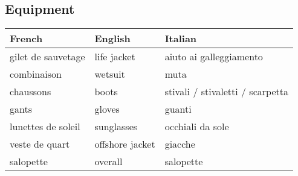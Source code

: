 \documentclass[a4paper, 12pt, twoside]{article}
\begin{document}
    \begin{indt}{\section{Equipment}} %
        \begin{tabular}{|l|l|l|}
            \hline %
            \textbf{French}
            & \textbf{English}
            & \textbf{Italian}
            \\
            \hline
            \hline %
            gilet de sauvetage %
            & life jacket
            & aiuto ai galleggiamento
            \\
            \hline %
            combinaison %
            & wetsuit
            & muta
            \\
            \hline %
            chaussons %
            & boots
            & stivali / stivaletti / scarpetta
            \\
            \hline %
            gants %
            & gloves
            & guanti
            \\
            \hline %
            lunettes de soleil %
            & sunglasses
            & occhiali da sole
            \\
            \hline %
            veste de quart %
            & offshore jacket
            & giacche
            \\
            \hline %
            salopette %
            & overall
            & salopette
            \\
            \hline %
        \end{tabular}
    \end{indt} %
\end{document}
